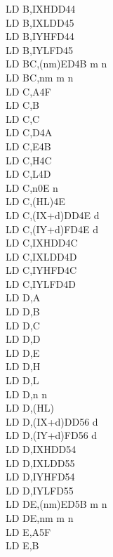 \begin{multicols}{3}
{\begin{tabbing}
        LD B,IXH\UNDOC\>DD44\\
        LD B,IXL\UNDOC\>DD45\\
        LD B,IYH\UNDOC\>FD44\\
        LD B,IYL\UNDOC\>FD45\\
        LD BC,(nm)\>ED4B m n\\
        LD BC,nm m n\\
        LD C,A\>4F\\
        LD C,B\\
        LD C,C\\
        LD C,D\>4A\\
        LD C,E\>4B\\
        LD C,H\>4C\\
        LD C,L\>4D\\
        LD C,n\>0E n\\
        LD C,(HL)\>4E\\
        LD C,(IX+d)\>DD4E d\\
        LD C,(IY+d)\>FD4E d\\
        LD C,IXH\UNDOC\>DD4C\\
        LD C,IXL\UNDOC\>DD4D\\
        LD C,IYH\UNDOC\>FD4C\\
        LD C,IYL\UNDOC\>FD4D\\
        LD D,A\\
        LD D,B\\
        LD D,C\\
        LD D,D\\
        LD D,E\\
        LD D,H\\
        LD D,L\\
        LD D,n n\\
        LD D,(HL)\\
        LD D,(IX+d)\>DD56 d\\
        LD D,(IY+d)\>FD56 d\\
        LD D,IXH\UNDOC\>DD54\\
        LD D,IXL\UNDOC\>DD55\\
        LD D,IYH\UNDOC\>FD54\\
        LD D,IYL\UNDOC\>FD55\\
        LD DE,(nm)\>ED5B m n\\
        LD DE,nm m n\\
        LD E,A\>5F\\
        LD E,B\\

\end{tabbing}}
\end{multicols}
